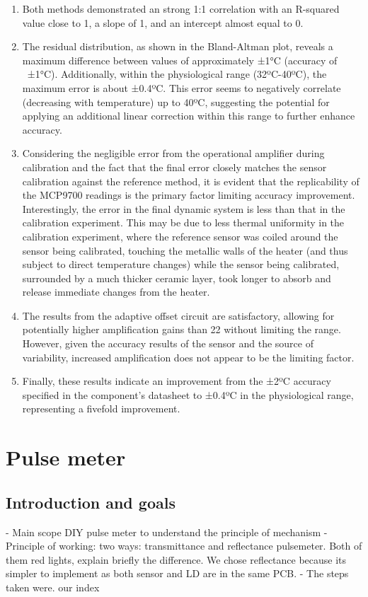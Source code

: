 \documentclass[conference]{IEEEtran}
\begin{document}
      \begin{enumerate}
      \item Both methods demonstrated an strong 1:1 correlation with an R-squared value close to 1, a slope of 1, and an intercept almost equal to 0.
      \item The residual distribution, as shown in the Bland-Altman plot, reveals a maximum difference between values of approximately ±1°C (accuracy of ~±1°C). Additionally, within the physiological range (32ºC-40ºC), the maximum error is about ±0.4ºC. This error seems to negatively correlate (decreasing with temperature) up to 40ºC, suggesting the potential for applying an additional linear correction within this range to further enhance accuracy.
      \item Considering the negligible error from the operational amplifier during calibration and the fact that the final error closely matches the sensor calibration against the reference method, it is evident that the replicability of the MCP9700 readings is the primary factor limiting accuracy improvement. 
      Interestingly, the error in the final dynamic system is less than that in the calibration experiment. This may be due to less thermal uniformity in the calibration experiment, 
      where the reference sensor was coiled around the sensor being calibrated, touching the metallic walls of the heater (and thus subject to direct temperature changes) while the 
      sensor being calibrated, surrounded by a much thicker ceramic layer, took longer to absorb and release immediate changes from the heater.
      \item The results from the adaptive offset circuit are satisfactory, allowing for potentially higher amplification gains than 22 without limiting the range. However, given the accuracy results of the sensor and the source of variability, increased amplification does not appear to be the limiting factor.
      \item Finally, these results indicate an improvement from the ±2ºC accuracy specified in the component's datasheet to ±0.4ºC in the physiological range, representing a fivefold improvement. 
      
      \end{enumerate}

\section{Pulse meter} %
   \subsection{Introduction and goals}
    - Main scope DIY pulse meter to understand the principle of mechanism
- Principle of working: two ways: transmittance and reflectance pulsemeter. Both of them red lights, explain briefly the difference. We chose reflectance because its simpler to implement as both sensor and LD are in the 
same PCB.
- The steps taken were. our index
\end{document}
